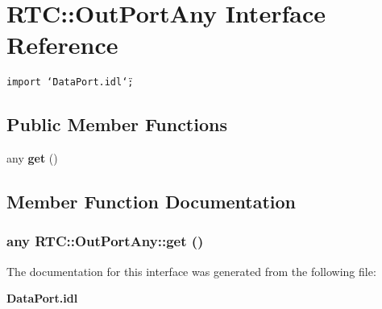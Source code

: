 \section{RTC::Out\-Port\-Any Interface Reference}
\label{interfaceRTC_1_1OutPortAny}
{\tt import \char`\"{}Data\-Port.idl\char`\"{};}

\subsection*{Public Member Functions}
\begin{CompactItemize}
\item 
any {\bf get} ()
\end{CompactItemize}


\subsection{Member Function Documentation}
\subsubsection{\setlength{\rightskip}{0pt plus 5cm}any RTC::Out\-Port\-Any::get ()}\label{interfaceRTC_1_1OutPortAny_RTC_1_1OutPortAnya0}




The documentation for this interface was generated from the following file:\begin{CompactItemize}
\item 
{\bf Data\-Port.idl}\end{CompactItemize}
